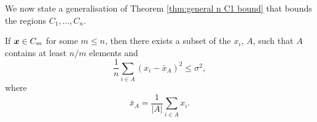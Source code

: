 	
	We now state a generalisation of Theorem \ref{thm:general n C1 bound} that bounds the regions $C_1, \dots, C_n$.

	\label{sec:bounding Cm}
		\begin{theorem}
			If ${\bm{{x}}} \in C_m$ for some $m \leq n$, then there exists a subset of the $x_i$, $A$, such that $A$ contains at least $n/m$ elements and
			\begin{equation}
				\frac{1}{n} \sum_{i \in A} \left(x_i - \bar{x}_A\right)^2 \leq \sigma^2,
			\end{equation}
			where
			\begin{equation}
				\bar{x}_A = \frac{1}{|A|}\sum_{i \in A} x_i.
			\end{equation}
			\label{thm:general n constraints result}
		\end{theorem}
